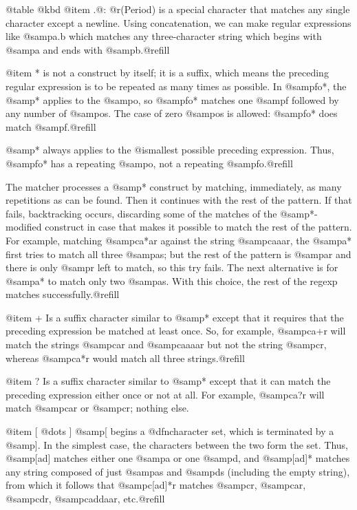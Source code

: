 {{{{{{{{{{@table @kbd
@item .@: @r{(Period)}
is a special character that matches any single character except a newline.
Using concatenation, we can make regular expressions like @samp{a.b} which
matches any three-character string which begins with @samp{a} and ends with
@samp{b}.@refill

@item *
is not a construct by itself; it is a suffix, which means the
preceding regular expression is to be repeated as many times as
possible.  In @samp{fo*}, the @samp{*} applies to the @samp{o}, so
@samp{fo*} matches one @samp{f} followed by any number of @samp{o}s.
The case of zero @samp{o}s is allowed: @samp{fo*} does match
@samp{f}.@refill

@samp{*} always applies to the @i{smallest} possible preceding
expression.  Thus, @samp{fo*} has a repeating @samp{o}, not a
repeating @samp{fo}.@refill

The matcher processes a @samp{*} construct by matching, immediately,
as many repetitions as can be found.  Then it continues with the rest
of the pattern.  If that fails, backtracking occurs, discarding some
of the matches of the @samp{*}-modified construct in case that makes
it possible to match the rest of the pattern.  For example, matching
@samp{ca*ar} against the string @samp{caaar}, the @samp{a*} first
tries to match all three @samp{a}s; but the rest of the pattern is
@samp{ar} and there is only @samp{r} left to match, so this try fails.
The next alternative is for @samp{a*} to match only two @samp{a}s.
With this choice, the rest of the regexp matches successfully.@refill

@item +
Is a suffix character similar to @samp{*} except that it requires that
the preceding expression be matched at least once.  So, for example,
@samp{ca+r} will match the strings @samp{car} and @samp{caaaar}
but not the string @samp{cr}, whereas @samp{ca*r} would match all
three strings.@refill

@item ?
Is a suffix character similar to @samp{*} except that it can match the
preceding expression either once or not at all.  For example,
@samp{ca?r} will match @samp{car} or @samp{cr}; nothing else.

@item [ @dots{} ]
@samp{[} begins a @dfn{character set}, which is terminated by a
@samp{]}.  In the simplest case, the characters between the two form
the set.  Thus, @samp{[ad]} matches either one @samp{a} or one
@samp{d}, and @samp{[ad]*} matches any string composed of just
@samp{a}s and @samp{d}s (including the empty string), from which it
follows that @samp{c[ad]*r} matches @samp{cr}, @samp{car}, @samp{cdr},
@samp{caddaar}, etc.@refill

}}}}}}}}}}
